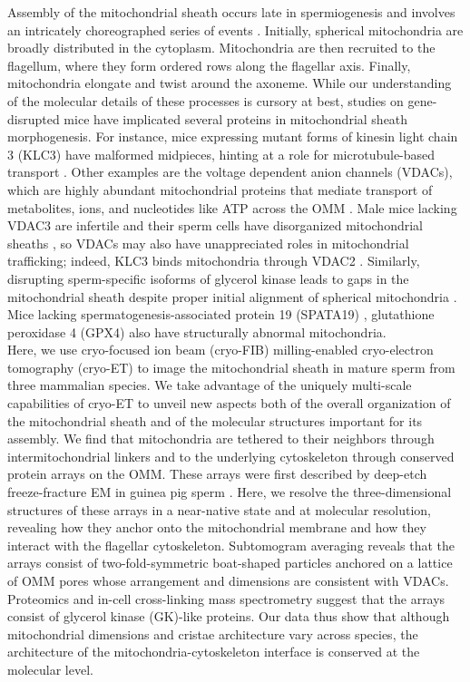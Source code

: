 Assembly of the mitochondrial sheath occurs late in spermiogenesis and involves an intricately choreographed series of events \cite{Otani1988, Ho2007}. Initially, spherical mitochondria are broadly distributed in the cytoplasm. Mitochondria are then recruited to the flagellum, where they form ordered rows along the flagellar axis. Finally, mitochondria elongate and twist around the axoneme. While our understanding of the molecular details of these processes is cursory at best, studies on gene-disrupted mice have implicated several proteins in mitochondrial sheath morphogenesis. For instance, mice expressing mutant forms of kinesin light chain 3 (KLC3) have malformed midpieces, hinting at a role for microtubule-based transport \cite{Zhang2012}. Other examples are the voltage dependent anion channels (VDACs), which are highly abundant mitochondrial proteins that mediate transport of metabolites, ions, and nucleotides like ATP across the OMM \cite{Colombini2012}. Male mice lacking VDAC3 are infertile and their sperm cells have disorganized mitochondrial sheaths \cite{Sampson2001}, so VDACs may also have unappreciated roles in mitochondrial trafficking; indeed, KLC3 binds mitochondria through VDAC2 \cite{Zhang2012}. Similarly, disrupting sperm-specific isoforms of glycerol kinase leads to gaps in the mitochondrial sheath despite proper initial alignment of spherical mitochondria \cite{Chen2017a, Shimada2019}. Mice lacking spermatogenesis-associated protein 19 (SPATA19) \cite{Mi2015}, glutathione peroxidase 4 (GPX4) \cite{Schneider2009, Imai2009} also have structurally abnormal mitochondria.\\[0.25cm]
\raggedbottom
Here, we use cryo-focused ion beam (cryo-FIB) milling-enabled cryo-electron tomography (cryo-ET) to image the mitochondrial sheath in mature sperm from three mammalian species. We take advantage of the uniquely multi-scale capabilities of cryo-ET to unveil new aspects both of the overall organization of the mitochondrial sheath and of the molecular structures important for its assembly. We find that mitochondria are tethered to their neighbors through intermitochondrial linkers and to the underlying cytoskeleton through conserved protein arrays on the OMM. These arrays were first described by deep-etch freeze-fracture EM in guinea pig sperm \cite{Friend1981}. Here, we resolve the three-dimensional structures of these arrays in a near-native state and at molecular resolution, revealing how they anchor onto the mitochondrial membrane and how they interact with the flagellar  cytoskeleton. Subtomogram averaging reveals that the arrays consist of two-fold-symmetric boat-shaped particles anchored on a lattice of OMM pores whose arrangement and dimensions are consistent with VDACs. Proteomics and in-cell cross-linking mass spectrometry suggest that the arrays consist of glycerol kinase (GK)-like proteins. Our data thus show that although mitochondrial dimensions and cristae architecture vary across species, the architecture of the mitochondria-cytoskeleton interface is conserved at the molecular level.
\pagebreak
